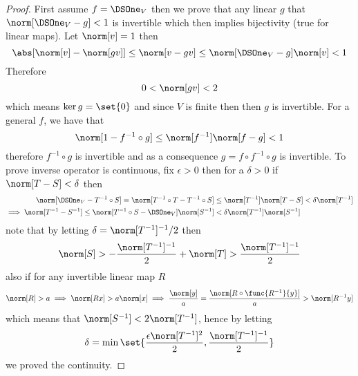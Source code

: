 \begin{proof}
    First assume \(f = \DSOne_V\) then we prove that any linear \(g\) that \(\norm[\DSOne_V - g] < 1\) is invertible which then implies bijectivity (true for linear maps). Let \(\norm[v] = 1\) then
    \begin{equation*}
        \abs[\norm[v] - \norm[gv]] \leq \norm[v - gv] \leq \norm[\DSOne_V - g] \norm[v] < 1
    \end{equation*}
    Therefore
    \begin{equation*}
        0 < \norm[gv] < 2
    \end{equation*}
    which means \(\ker g = \set{0}\) and since \(V\) is finite then then \(g\) is invertible. For a general \(f\), we have that
    \begin{equation*}
        \norm[1 - f^{-1} \circ g] \leq \norm[f^{-1}]\norm[f -g] < 1
    \end{equation*}
    therefore \(f^{-1} \circ g\) is invertible and as a consequence \(g = f \circ f^{-1} \circ g\) is invertible. To prove inverse operator is continuous, fix \(\epsilon > 0\) then for a \(\delta > 0\) if \(\norm[T-S] < \delta\) then
    \begin{align*}
        \norm[\DSOne_V- T^{-1} \circ S]= \norm[T^{-1} \circ T  - T^{-1} \circ S]           & \leq \norm[T^{-1}] \norm[T-S] < \delta \norm[T^{-1}] \\
        \implies  \norm[T^{-1} - S^{-1}] \leq \norm[T^{-1}\circ S - \DSOne_V]\norm[S^{-1}] & < \delta \norm[T^{-1}] \norm[S^{-1}]
    \end{align*}
    note that by letting \(\delta = \norm[T^{-1}]^{-1}/2\) then
    \begin{equation*}
        \norm[S] > -\dfrac{\norm[T^{-1}]^{-1}}{2} + \norm[T] > \dfrac{\norm[T^{-1}]^{-1}}{2}
    \end{equation*}
    also if for any invertible linear map \(R\)
    \begin{equation*}
        \norm[R] > a \implies \norm[Rx] > a\norm[x] \implies \dfrac{\norm[y]}{a} = \dfrac{\norm[R\circ \func{R^{-1}}{y}]}{a} > \norm[R^{-1}y]
    \end{equation*}
    which means that \(\norm[S^{-1}] < 2 \norm[T^{-1}]\), hence by letting
    \begin{equation*}
        \delta = \min \set{\dfrac{\epsilon \norm[T^{-1}]^2}{2} , \dfrac{\norm[T^{-1}]^{-1}}{2}}
    \end{equation*}
    we proved the continuity.
\end{proof}

